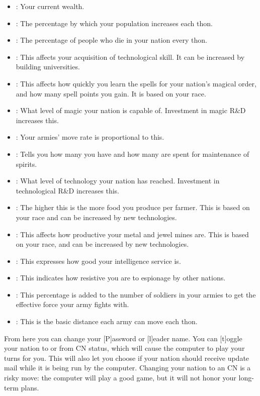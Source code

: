 \begin{itemize}
\item
{}: Your current wealth.
\item
{}: The percentage by which your population increases
each thon.
\item
{}: The percentage of people who die in your nation every thon.
\item
{}: This affects your acquisition of technological skill.
It can be increased by building universities.
\item
{}: This affects how quickly you learn the spells for
your nation's magical order, and how many spell points you gain.  It
is based on your race.
\item
{}: What level of magic your nation is capable of.
Investment in magic R\&D increases this.
\item
{}: Your armies' move rate is proportional to this.
\item
{}: Tells you how many you have and how many are spent for 
maintenance of spirits.
\item
{}: What level of technology your nation has reached.
Investment in technological R\&D increases this.
\item
{}:  The higher this is the more food you produce
per farmer.  This is based on your race and can be increased by new
technologies.
\item
{}: This affects how productive your metal and jewel
mines are.  This is based on your race, and can be increased by new
technologies.
\item
{}: This expresses how good your intelligence service is.
\item
{}: This indicates how resistive you are to espionage by
other nations.
\item
{}: This percentage is added to the number
of soldiers in your armies to get the effective force your army fights
with.
\item
{}: This is the basic distance each army can move
each thon. 
\end{itemize}

From here you can change your [P]assword or [l]eader name.  You can
[t]oggle your nation to or from CN status, which will cause the
computer to play your turns for you.  This will also let you choose if
your nation should receive update mail while it is being run by the
computer. Changing your nation to an CN is a risky move: the computer
will play a good game, but it will not honor your long-term plans.

